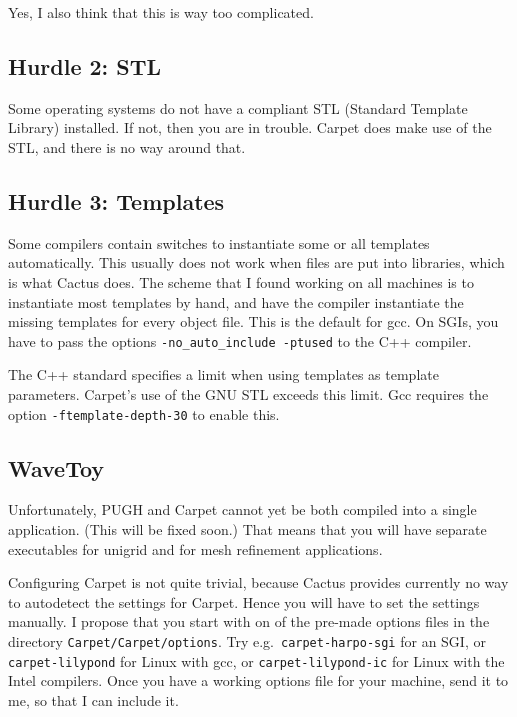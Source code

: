 Yes, I also think that this is way too complicated.

\subsection{Hurdle 2: STL}

Some operating systems do not have a compliant STL (Standard Template
Library) installed.  If not, then you are in trouble.  Carpet does
make use of the STL, and there is no way around that.

\subsection{Hurdle 3: Templates}

Some compilers contain switches to instantiate some or all templates
automatically.  This usually does not work when files are put into
libraries, which is what Cactus does.  The scheme that I found working
on all machines is to instantiate most templates by hand, and have the
compiler instantiate the missing templates for every object file.
This is the default for gcc.  On SGIs, you have to pass the options
\texttt{-no\_auto\_include -ptused} to the C++ compiler.

The C++ standard specifies a limit when using templates as template
parameters.  Carpet's use of the GNU STL exceeds this limit.  Gcc
requires the option \texttt{-ftemplate-depth-30} to enable this.

\subsection{WaveToy}

Unfortunately, PUGH and Carpet cannot yet be both compiled into a
single application.  (This will be fixed soon.)  That means that you
will have separate executables for unigrid and for mesh refinement
applications.

Configuring Carpet is not quite trivial, because Cactus provides
currently no way to autodetect the settings for Carpet.  Hence you
will have to set the settings manually.  I propose that you start with
on of the pre-made options files in the directory
\texttt{Carpet/Carpet/options}.  Try e.g.\ \texttt{carpet-harpo-sgi}
for an SGI, or \texttt{carpet-lilypond} for Linux with gcc, or
\texttt{carpet-lilypond-ic} for Linux with the Intel compilers.  Once
you have a working options file for your machine, send it to me, so
that I can include it.

